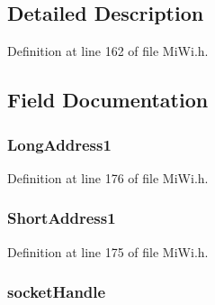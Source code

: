 \subsection{Detailed Description}


Definition at line 162 of file Mi\+Wi.\+h.



\subsection{Field Documentation}
\hypertarget{struct___o_p_e_n___s_o_c_k_e_t_a33b58a55eb636e80eeeae13b6cebca4b}{}
\subsubsection[{Long\+Address1}]{ Long\+Address1}\label{struct___o_p_e_n___s_o_c_k_e_t_a33b58a55eb636e80eeeae13b6cebca4b}


Definition at line 176 of file Mi\+Wi.\+h.

\hypertarget{struct___o_p_e_n___s_o_c_k_e_t_ac4a41c63bb7eef54536bb7a876d788cb}{}
\subsubsection[{Short\+Address1}]{ Short\+Address1}\label{struct___o_p_e_n___s_o_c_k_e_t_ac4a41c63bb7eef54536bb7a876d788cb}


Definition at line 175 of file Mi\+Wi.\+h.

\hypertarget{struct___o_p_e_n___s_o_c_k_e_t_a63a91174ab437f2a442960ea2891587d}{}
\subsubsection[{socket\+Handle}]{ socket\+Handle}\label{struct___o_p_e_n___s_o_c_k_e_t_a63a91174ab437f2a442960ea2891587d}


